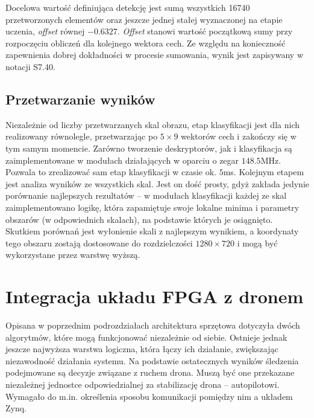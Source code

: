 Docelowa wartość definiująca detekcję jest sumą wszystkich 16740 przetworzonych elementów oraz jeszcze jednej stałej wyznaczonej na etapie uczenia, \textit{offset} równej $-0.6327$. 
\textit{Offset} stanowi wartość początkową sumy przy rozpoczęciu obliczeń dla kolejnego wektora cech. %
Ze względu na konieczność zapewnienia dobrej dokładności w procesie sumowania, wynik jest zapisywany w notacji S7.40.

\subsection{Przetwarzanie wyników}

Niezależnie od liczby przetwarzanych skal obrazu, etap klasyfikacji jest dla nich realizowany równolegle, przetwarzając po $5\times 9$ wektorów cech i zakończy się w tym samym momencie. Zarówno tworzenie deskryptorów, jak i klasyfikacja są zaimplementowane w modułach działających w oparciu o zegar $148.5$MHz. Pozwala to zrealizować sam etap klasyfikacji w czasie ok. $5$ms.
Kolejnym etapem jest analiza wyników ze wszystkich skal.
Jest on dość prosty, gdyż zakłada jedynie porównanie najlepszych rezultatów -- w modułach klasyfikacji każdej ze skal zaimplementowano logikę, która zapamiętuje swoje lokalne minima i parametry obszarów (w odpowiednich skalach), na podstawie których je osiągnięto. 
Skutkiem porównań jest wyłonienie skali z najlepszym wynikiem, a koordynaty tego obszaru zostają dostosowane do rozdzielczości $1280 \times 720$ i mogą być wykorzystane przez warstwę wyższą. %





\section{Integracja układu FPGA z dronem}

Opisana w poprzednim podrozdziałach architektura sprzętowa dotyczyła dwóch algorytmów, które mogą funkcjonować niezależnie od siebie. Ostnieje jednak jeszcze najwyższa warstwa logiczna, która łączy ich działanie, zwiększając niezawodność działania systemu. Na podstawie ostatecznych wyników śledzenia podejmowane są decyzje związane z ruchem drona. Muszą być one przekazane niezależnej jednostce odpowiedzialnej za stabilizację drona -- autopilotowi. Wymagało do m.in. określenia sposobu komunikacji pomiędzy nim a układem Zynq.


